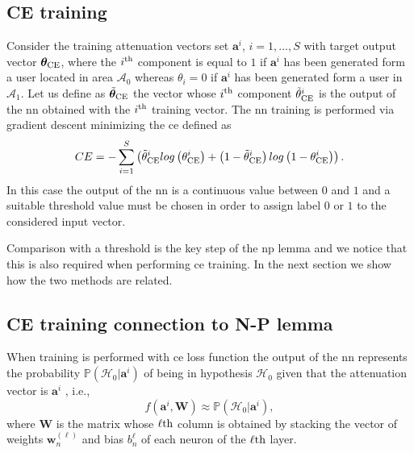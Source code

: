 \documentclass[draftcls,onecolumn,12pt]{IEEEtran}
\begin{document}
\subsection{CE training}
Consider the training attenuation vectors set $\bm{a}^i$, $i=1,...,S$ with target output vector $\bm{\theta}_{\rm CE}$, where the $i^{\rm th}$ component is equal to $1$ if $\bm{a}^i$ has been generated form a user located in area $\mathcal{A}_0$ whereas $\theta_i=0$ if $\bm{a}^i$ has been generated form a user in $\mathcal{A}_1$. Let us define as $\tilde{\bm{\theta}}_{\rm CE}$ the vector whose $i^{\rm th}$ component $\tilde{\theta}^i_{\rm CE}$ is the output of the \ac{nn} obtained with the $i^{\rm th}$ training vector. The \ac{nn} training is performed via gradient descent minimizing the \ac{ce} defined as
\begin{equation}\label{eq:ce}
CE = -\sum_{i=1}^{S}\left(\tilde{\theta}^i_{\rm CE}log\left(\theta^i_{\rm CE}\right)+\left(1-\tilde{\theta}^i_{\rm CE}\right)log\left(1-\theta^i_{\rm CE}\right) \right).
\end{equation}
In this case the output of the \ac{nn} is a continuous value between $0$ and $1$ and a suitable threshold value must be chosen in order to assign label $0$ or $1$ to the considered input vector.

Comparison with a threshold is the key step of the \ac{np} lemma and we notice that this is also required when performing \ac{ce} training. In the next section we show how the two methods are related.

\subsection{CE training connection to N-P lemma}
When training is performed with \ac{ce} loss function the output of the \ac{nn} represents the probability $\mathbb{P}(\mathcal{H}_0|\bm{a}^i)$ of being in hypothesis $\mathcal{H}_0$ given that the attenuation vector is $\bm{a}^i$ \cite{Bishop2006}, i.e.,
\begin{equation}
    f(\bm{a}^i,\bm{W}) \approx \mathbb{P}(\mathcal{H}_0|\bm{a}^i),
\end{equation} 
where $\bm{W}$ is the matrix whose $\ell{\rm th}$ column is obtained by stacking the vector of weights $\bm{w}_n^{(\ell)}$ and bias $b_n^\ell$ of each neuron of the $\ell{\rm th}$ layer.
\end{document}

